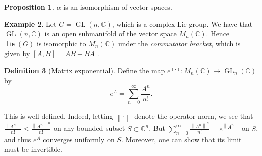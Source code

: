 \documentclass[10pt,letterpaper,cm]{nupset}
\theoremstyle{definition}
\newtheorem{defn}{Definition}[subsection]
\newtheorem{exmp}[defn]{Example}
\theoremstyle{theorem}
\newtheorem{prop}[defn]{Proposition}
\theoremstyle{remark}
\newcommand{\C}{\mathbb C}
\newcommand{\1}{\mathbb{1}}
\newcommand{\0}{\vec 0}
\DeclareMathOperator{\GL}{GL}
\DeclareMathOperator{\lie}{\mathsf{Lie}}
\begin{document}
\begin{prop}
$\alpha$ is an isomorphism of vector spaces. 
\end{prop}


\begin{exmp}
Let $G = \GL(n, \C)$, which is a complex Lie group. We have that $\GL(n, \C)$ is an open submanifold of the vector space $M_n(\C)$. Hence $\lie(G)$ is  isomorphic to $M_n(\C)$ under the \textit{commutator bracket}, which is given by $\left[A,B\right]= AB -BA$ .
\end{exmp}

\begin{defn}[Matrix exponential]
Define the map $e^{\left(\cdot\right)} : M_n(\C) \to \GL_n(\C)$ by 
\[
e^A  = \sum_{n=0}^{\infty} \frac{A^n }{n!}.
\]
\end{defn}

This is well-defined. Indeed, letting $\left\lVert{\cdot}\right\rVert$ denote the operator norm, we see that $\frac{\left\lVert{A^n}\right\rVert}{n!}\leq \frac{\left\lVert{A^n}\right\rVert^n}{n!}$ on any bounded subset $S\subset \C^n$. But $\sum_{n=0}^{\infty}\frac{\left\lVert{A^n}\right\rVert^n}{n!} = e^{\left\lVert{A^n}\right\rVert}$ on $S$, and thus $e^A$ converges uniformly on $S$. Moreover, one can show that its limit must be invertible.
\end{document}
